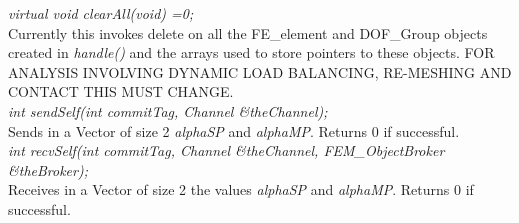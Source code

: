 {\em virtual void clearAll(void) =0;} \\
Currently this invokes delete on all the FE\_element and DOF\_Group
objects created in {\em handle()} and the arrays used to store
pointers to these objects. FOR ANALYSIS INVOLVING DYNAMIC LOAD
BALANCING, RE-MESHING AND CONTACT THIS MUST CHANGE. \\

{\em int sendSelf(int commitTag, Channel \&theChannel); } \\
Sends in a Vector of size 2 {\em alphaSP} and {\em alphaMP}. Returns
$0$ if successful. \\

{\em int recvSelf(int commitTag, Channel \&theChannel, FEM\_ObjectBroker
\&theBroker); } \\
Receives in a Vector of size 2 the values {\em alphaSP} and {\em
alphaMP}. Returns $0$ if successful. 
